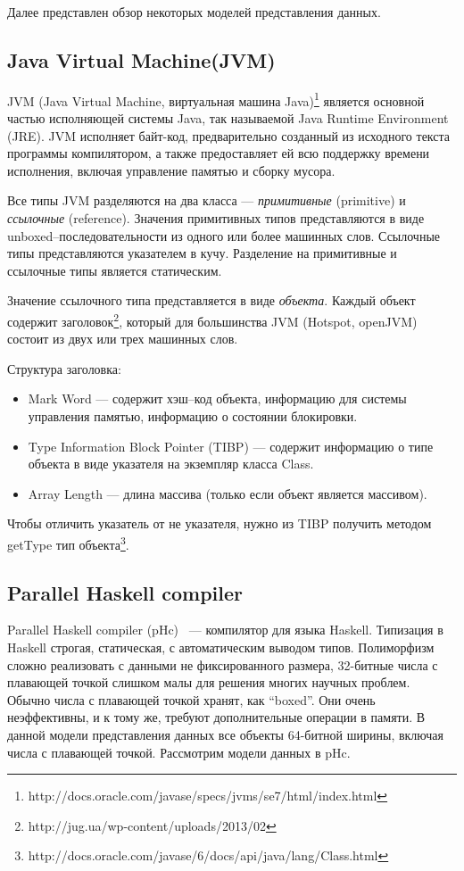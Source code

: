 Далее представлен обзор некоторых моделей представления данных.

\subsection {Java Virtual Machine(JVM)}

JVM (Java Virtual Machine, виртуальная машина Java)\footnote{http://docs.oracle.com/javase/specs/jvms/se7/html/index.html}
является основной частью исполняющей системы Java, так называемой Java Runtime Environment (JRE).
JVM исполняет байт-код, предварительно созданный из исходного текста программы компилятором, а также
предоставляет ей всю поддержку времени исполнения, включая управление памятью и сборку мусора.

Все типы JVM разделяются на два класса --- \emph{примитивные} (primitive) и \emph{ссылочные} (reference).
Значения примитивных типов представляются в виде unboxed--последовательности из одного или более машинных слов.
Ссылочные типы представляются указателем в кучу. Разделение на примитивные и ссылочные типы является статическим.

Значение ссылочного типа представляется в виде \emph{объекта}.
Каждый объект содержит заголовок\footnote{http://jug.ua/wp-content/uploads/2013/02}, который для 
большинства JVM (Hotspot, openJVM) состоит из двух или трех машинных слов.

Структура заголовка:

\begin{itemize}
\item Mark Word --- содержит хэш--код объекта, информацию для системы управления памятью, информацию о состоянии блокировки. 
\item Type Information Block Pointer (TIBP) --- содержит информацию о типе объекта в виде указателя на экземпляр класса Class.
\item Array Length --- длина массива (только если объект является массивом).
\end{itemize}            

Чтобы отличить указатель от не указателя, нужно из TIBP получить методом getType тип объекта\footnote{http://docs.oracle.com/javase/6/docs/api/java/lang/Class.html}.

\subsection {Parallel Haskell compiler}

Parallel Haskell compiler (pHc)~\cite{pHc} — компилятор для языка Haskell.
Типизация в Haskell строгая, статическая, с автоматическим выводом типов.
Полиморфизм сложно реализовать с данными не фиксированного размера, 32-битные
числа с плавающей точкой слишком малы для решения многих научных проблем. Обычно
числа с плавающей точкой хранят, как ``boxed''. 
Они очень неэффективны, и к тому же, требуют дополнительные операции в памяти.
В данной модели представления данных все объекты 64-битной ширины, включая числа с плавающей точкой.
Рассмотрим модели данных в pHc.

